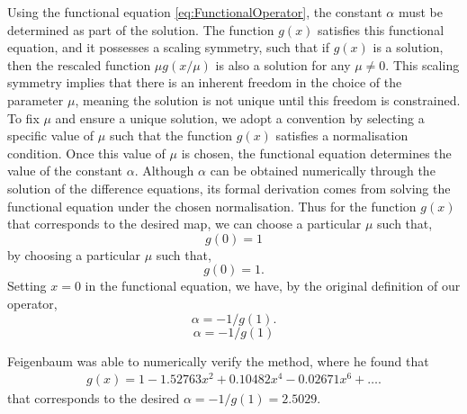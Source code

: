 Using the functional equation \eqref{eq:FunctionalOperator}, the constant $\alpha$ must be determined as part of the solution. The function $g(x)$ satisfies this functional equation, and it possesses a scaling symmetry, such that if $g(x)$ is a solution, then the rescaled function $\mu g(x/\mu)$ is also a solution for any $\mu \neq 0$. This scaling symmetry implies that there is an inherent freedom in the choice of the parameter $\mu$, meaning the solution is not unique until this freedom is constrained. To fix $\mu$ and ensure a unique solution, we adopt a convention by selecting a specific value of $\mu$ such that the function $g(x)$ satisfies a normalisation condition. Once this value of $\mu$ is chosen, the functional equation determines the value of the constant $\alpha$. Although $\alpha$ can be obtained numerically through the solution of the difference equations, its formal derivation comes from solving the functional equation under the chosen normalisation. Thus for the function $g(x)$ that corresponds to the desired map, we can choose a particular $\mu$ such that,
$$
g(0)=1
$$
by choosing a particular $\mu$ such that,
$$
g(0)=1.
$$
Setting $x=0$ in the functional equation, we have, by the original definition  of our operator,
$$
\alpha = -1/g(1).
$$
$$
\alpha = -1/g(1)
$$

Feigenbaum was able to numerically verify the method, where he found that
\begin{align}
    g(x)= 1 - 1.52763x^2 + 0.10482x^4- 0.02671x^6 + \dots .\label{eq:feigenbaum}
\end{align}
that corresponds to the desired $\alpha =-1/g(1)=2.5029$.

